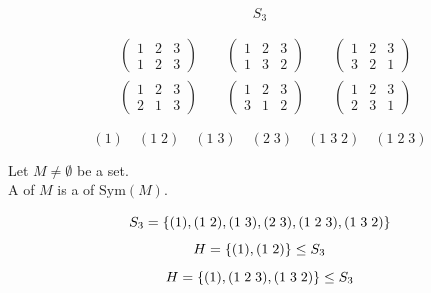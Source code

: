 \begin{frame}{}
  \[
    S_{3}
  \]

  \begin{align*}
    &\begin{pmatrix}
      1 & 2 & 3 \\
      1 & 2 & 3
    \end{pmatrix} \qquad
    \begin{pmatrix}
      1 & 2 & 3 \\
      1 & 3 & 2
    \end{pmatrix} \qquad
    \begin{pmatrix}
      1 & 2 & 3 \\
      3 & 2 & 1
    \end{pmatrix} \\[6pt]
    &\begin{pmatrix}
      1 & 2 & 3 \\
      2 & 1 & 3
    \end{pmatrix} \qquad
    \begin{pmatrix}
      1 & 2 & 3 \\
      3 & 1 & 2
    \end{pmatrix} \qquad
    \begin{pmatrix}
      1 & 2 & 3 \\
      2 & 3 & 1
    \end{pmatrix}
  \end{align*}

  \pause
  \[
    (1) \quad (1\; 2) \quad (1\; 3)
    \quad (2\; 3) \quad (1\; 3\; 2) \quad (1\; 2\; 3)
  \]
\end{frame}

\begin{frame}
  \begin{definition}
    Let $M \neq \emptyset$ be a set. \\
    A  of $M$ is a  of $\text{Sym}(M)$.
  \end{definition}

  \pause
  \[
    S_{3} = \{(1), (1\; 2), (1\; 3), (2\; 3), (1\; 2\; 3), (1\; 3\; 2)\}
  \]
  \pause
  \[
    H = \{(1), (1\; 2)\} \le S_{3}
  \]
  \pause
  \[
    H = \{(1), (1\; 2\; 3), (1\; 3\; 2)\} \le S_{3}
  \]
\end{frame}

